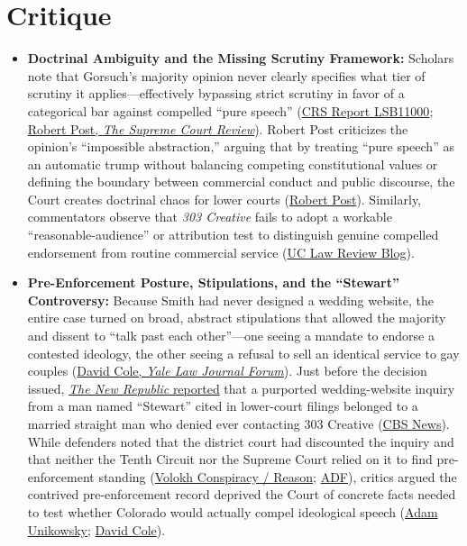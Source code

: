 \documentclass[12pt]{article}
\begin{document}
\section{Critique}
\begin{itemize}
  \item \textbf{Doctrinal Ambiguity and the Missing Scrutiny Framework:} Scholars note that Gorsuch's majority opinion never clearly specifies what tier of scrutiny it applies---effectively bypassing strict scrutiny in favor of a categorical bar against compelled ``pure speech'' (\href{https://www.everycrsreport.com/reports/LSB11000.html}{CRS Report LSB11000}; \href{https://www.journals.uchicago.edu/doi/pdf/10.1086/728867}{Robert Post, \textit{The Supreme Court Review}}). Robert Post criticizes the opinion's ``impossible abstraction,'' arguing that by treating ``pure speech'' as an automatic trump without balancing competing constitutional values or defining the boundary between commercial conduct and public discourse, the Court creates doctrinal chaos for lower courts (\href{https://www.journals.uchicago.edu/doi/pdf/10.1086/728867}{Robert Post}). Similarly, commentators observe that \textit{303 Creative} fails to adopt a workable ``reasonable-audience'' or attribution test to distinguish genuine compelled endorsement from routine commercial service (\href{https://uclawreview.org/2026/10/16/when-does-free-expression-end-and-discrimination-begin-an-analysis-of-how-lower-courts-have-applied-the-303-creative-llc-v-elenis-decision/}{UC Law Review Blog}).
  \item \textbf{Pre-Enforcement Posture, Stipulations, and the ``Stewart'' Controversy:} Because Smith had never designed a wedding website, the entire case turned on broad, abstract stipulations that allowed the majority and dissent to ``talk past each other''---one seeing a mandate to endorse a contested ideology, the other seeing a refusal to sell an identical service to gay couples (\href{https://scholarship.law.georgetown.edu/cgi/viewcontent.cgi?article=3596&context=facpub}{David Cole, \textit{Yale Law Journal Forum}}). Just before the decision issued, \href{https://newrepublic.com/article/173987/mysterious-case-fake-gay-marriage-website-real-straight-man-supreme-court}{\textit{The New Republic} reported} that a purported wedding-website inquiry from a man named ``Stewart'' cited in lower-court filings belonged to a married straight man who denied ever contacting 303 Creative (\href{https://www.cbsnews.com/news/supreme-court-303-creative-case-stewart-wedding-website-lgbtq-free-speech/}{CBS News}). While defenders noted that the district court had discounted the inquiry and that neither the Tenth Circuit nor the Supreme Court relied on it to find pre-enforcement standing (\href{https://reason.com/volokh/2023/07/18/more-on-standing-in-the-303-creative-case/}{Volokh Conspiracy / Reason}; \href{https://adflegal.org/article/responding-media-smear-303-creative/}{ADF}), critics argued the contrived pre-enforcement record deprived the Court of concrete facts needed to test whether Colorado would actually compel ideological speech (\href{https://adamunikowsky.substack.com/p/contrived-cases-make-bad-law}{Adam Unikowsky}; \href{https://scholarship.law.georgetown.edu/cgi/viewcontent.cgi?article=3596&context=facpub}{David Cole}).

\end{itemize}
\end{document}
